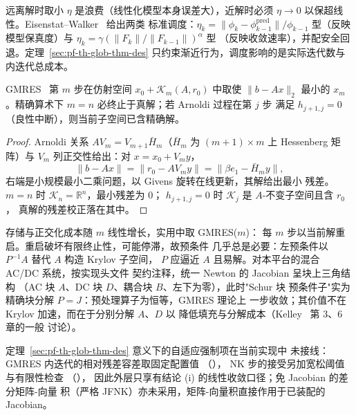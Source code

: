 \begin{remark}[强制项的自适应选择]\label{sec:pf-th-glob-rem-forcing}
远离解时取小 $\eta$ 是浪费（线性化模型本身误差大），近解时必须
$\eta\to0$ 以保超线性。Eisenstat--Walker~\cite{pfglob-ew} 给出两类
标准调度：$\eta_k=\lVert\phi_k-\phi_{k-1}^{\mathrm{pred}}\rVert/
\phi_{k-1}$ 型（反映模型保真度）与
$\eta_k=\gamma(\lVert F_k\rVert/\lVert F_{k-1}\rVert)^\alpha$ 型
（反映收敛速率），并配安全回退。定理~\ref{sec:pf-th-glob-thm-des}
只约束渐近行为，调度影响的是实际迭代数与内迭代总成本。
\end{remark}

\begin{proposition}\label{sec:pf-th-glob-prop-gmres}
GMRES~\cite{pfglob-saad-schultz} 第 $m$ 步在仿射空间
$x_0+\mathcal K_m(A,r_0)$ 中取使 $\lVert b-Ax\rVert_2$ 最小的
$x_m$。精确算术下 $m=n$ 必终止于真解；若 Arnoldi 过程在第 $j$ 步
满足 $h_{j+1,j}=0$（良性中断），则当前子空间已含精确解。
\end{proposition}

\begin{proof}
Arnoldi 关系 $AV_m=V_{m+1}\bar H_m$（$\bar H_m$ 为
$(m{+}1)\times m$ 上 Hessenberg 矩阵）与 $V_m$ 列正交性给出：对
$x=x_0+V_my$，
\[
\lVert b-Ax\rVert=\lVert r_0-AV_my\rVert
=\bigl\lVert\beta e_1-\bar H_m y\bigr\rVert,
\]
右端是小规模最小二乘问题，以 Givens 旋转在线更新，其解给出最小
残差。$m=n$ 时 $\mathcal K_n=\mathbb R^n$，最小残差为 0；
$h_{j+1,j}=0$ 时 $\mathcal K_j$ 是 $A$-不变子空间且含 $r_0$，
真解的残差校正落在其中。
\end{proof}

\begin{remark}[重启与预条件]\label{sec:pf-th-glob-rem-gmresrestart}
存储与正交化成本随 $m$ 线性增长，实用中取 GMRES($m$)：
每 $m$ 步以当前解重启。重启破坏有限终止性，可能停滞，故预条件
几乎总是必要：左预条件以 $P^{-1}A$ 替代 $A$ 构造 Krylov 子空间，
$P$ 应逼近 $A$ 且易解。对本平台的混合 AC/DC 系统，按实现头文件
契约注释，统一 Newton 的 Jacobian 呈块上三角结构
（AC 块 $A$、DC 块 $D$、耦合块 $B$、左下为零），此时"Schur 块
预条件子"实为精确块分解 $P=J$：预处理算子为恒等，GMRES 理论上
一步收敛；其价值不在 Krylov 加速，而在于分别分解 $A$、$D$ 以
降低填充与分解成本（Kelley~\cite{pfglob-kelley} 第 3、6 章的一般
讨论）。
\end{remark}

\begin{gapnote}
定理~\ref{sec:pf-th-glob-thm-des} 意义下的自适应强制项在当前实现中
未接线：GMRES 内迭代的相对残差容差取固定配置值
（），
NK 步的接受另加宽松阈值与有限性检查
（），
因此外层只享有结论 (i) 的线性收敛口径；免 Jacobian 的差分矩阵-向量
积（严格 JFNK）亦未采用，矩阵-向量积直接作用于已装配的 Jacobian。
\end{gapnote}

